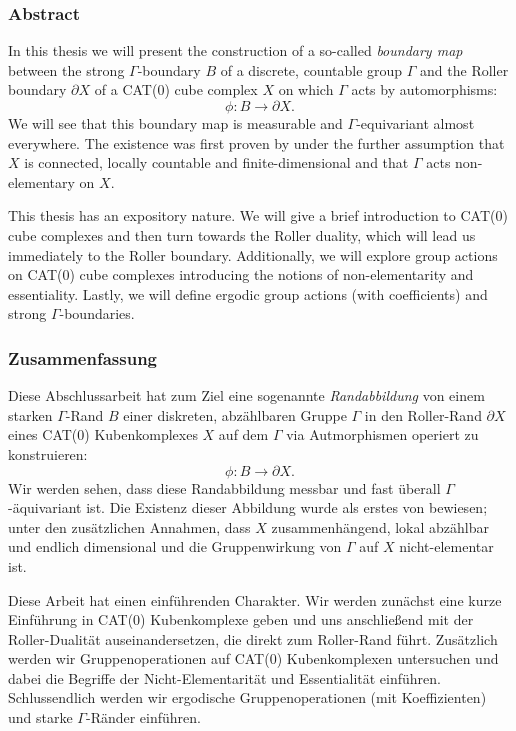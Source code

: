 \subsubsection*{Abstract}
%
\label{sec:abstract}

In this thesis we will present the construction of a so-called \emph{boundary map} between the strong \(\Gamma\)-boundary \(B\) of a discrete, countable group \(\Gamma\) and the Roller boundary \(\partial X\) of a CAT(0) cube complex \(X\) on which \(\Gamma\) acts by automorphisms:
\[
  \phi\colon B \to \partial X.
\]
We will see that this boundary map is measurable and \(\Gamma\)-equivariant almost everywhere. The existence was first proven by \textcite{MR3509968} under the further assumption that \(X\) is connected, locally countable and finite-dimensional and that \(\Gamma\) acts non-elementary on \(X\). 

This thesis has an expository nature. We will give a brief introduction to CAT(0) cube complexes and then turn towards the Roller duality, which will lead us immediately to the Roller boundary. Additionally, we will explore group actions on CAT(0) cube complexes introducing the notions of non-elementarity and essentiality. Lastly, we will define ergodic group actions (with coefficients) and strong \(\Gamma\)-boundaries.


\subsubsection*{Zusammenfassung}
\label{sec:Zusammenfassung}
Diese Abschlussarbeit hat zum Ziel eine sogenannte \emph{Randabbildung} von einem starken \(\Gamma\)-Rand \(B\) einer diskreten, abzählbaren Gruppe \(\Gamma\) in den Roller-Rand \(\partial X\) eines CAT(0) Kubenkomplexes \(X\) auf dem \(\Gamma\) via Autmorphismen operiert zu konstruieren:
\[
  \phi\colon B \to \partial X.
\]
Wir werden sehen, dass diese Randabbildung messbar und fast überall \(\Gamma\)-äquivariant ist. Die Existenz dieser Abbildung wurde als erstes von \textcite{MR3509968} bewiesen; unter den zusätzlichen Annahmen, dass \(X\) zusammenhängend, lokal abzählbar und endlich dimensional und die Gruppenwirkung von \(\Gamma\) auf \(X\) nicht-elementar ist.

Diese Arbeit hat einen einführenden Charakter. Wir werden zunächst eine kurze Einführung in CAT(0) Kubenkomplexe geben und uns anschließend mit der Roller-Dualität auseinandersetzen, die direkt zum Roller-Rand führt. Zusätzlich werden wir Gruppenoperationen auf CAT(0) Kubenkomplexen untersuchen und dabei die Begriffe der Nicht-Elementarität und Essentialität einführen. Schlussendlich werden wir ergodische Gruppenoperationen (mit Koeffizienten) und starke \(\Gamma\)-Ränder einführen.



